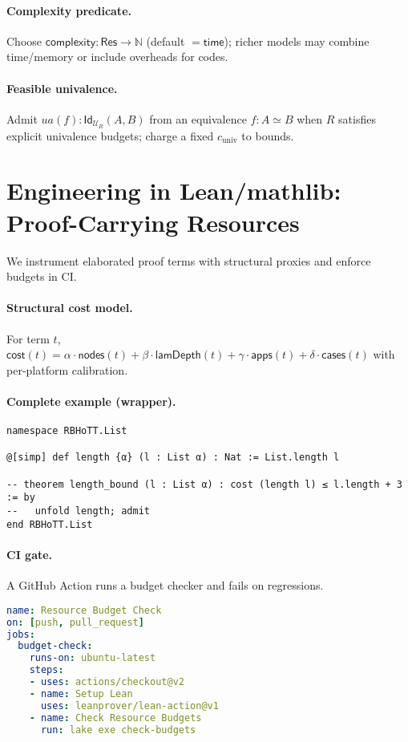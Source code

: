 \documentclass[11pt]{article}
\newcommand{\Res}{\mathsf{Res}}
\newcommand{\Time}{\mathsf{time}}
\newcommand{\Id}{\mathsf{Id}}
\newcommand{\UR}{\mathcal{U}}
\begin{document}
\paragraph{Complexity predicate.} Choose $\mathsf{complexity}:\Res\to\mathbb{N}$ (default $=\Time$); richer models may combine time/memory or include overheads for codes.
\paragraph{Feasible univalence.} Admit $ua(f):\Id_{\UR_R}(A,B)$ from an equivalence $f:A\simeq B$ when $R$ satisfies explicit univalence budgets; charge a fixed $c_{\mathrm{univ}}$ to bounds.

\section{Engineering in Lean/mathlib: Proof-Carrying Resources}
\label{sec:engineering}
We instrument elaborated proof terms with structural proxies and enforce budgets in CI.
\paragraph{Structural cost model.} For term $t$, $\mathsf{cost}(t)=\alpha\cdot\mathsf{nodes}(t)+\beta\cdot\mathsf{lamDepth}(t)+\gamma\cdot\mathsf{apps}(t)+\delta\cdot\mathsf{cases}(t)$ with per-platform calibration.
\paragraph{Complete example (wrapper).}
\begin{lstlisting}[language=lean]
namespace RBHoTT.List

@[simp] def length {α} (l : List α) : Nat := List.length l

-- theorem length_bound (l : List α) : cost (length l) ≤ l.length + 3 := by
--   unfold length; admit
end RBHoTT.List
\end{lstlisting}
\paragraph{CI gate.} A GitHub Action runs a budget checker and fails on regressions.
\begin{lstlisting}[language=yaml]
name: Resource Budget Check
on: [push, pull_request]
jobs:
  budget-check:
    runs-on: ubuntu-latest
    steps:
    - uses: actions/checkout@v2
    - name: Setup Lean
      uses: leanprover/lean-action@v1
    - name: Check Resource Budgets
      run: lake exe check-budgets
\end{lstlisting}
\end{document}
